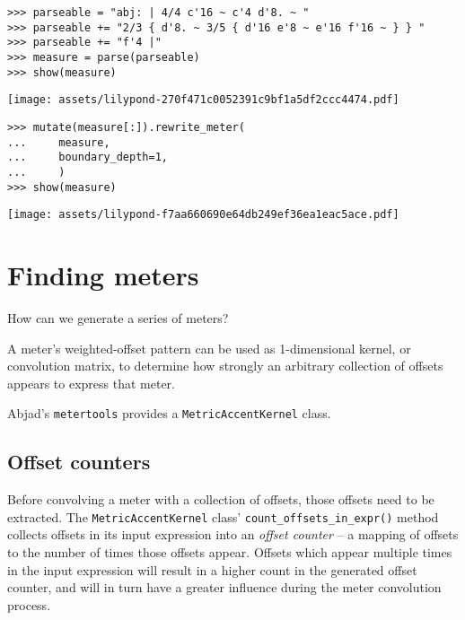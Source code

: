 \begin{singlespacing}
\vspace{-0.5\baselineskip}
\begin{lstlisting}
>>> parseable = "abj: | 4/4 c'16 ~ c'4 d'8. ~ "
>>> parseable += "2/3 { d'8. ~ 3/5 { d'16 e'8 ~ e'16 f'16 ~ } } "
>>> parseable += "f'4 |"
>>> measure = parse(parseable)
>>> show(measure)
\end{lstlisting}
\texttt{[image: assets/lilypond-270f471c0052391c9bf1a5df2ccc4474.pdf]}
\end{singlespacing}

\begin{comment}
<abjad>
mutate(measure[:]).rewrite_meter(
    measure,
    boundary_depth=1,
    )
show(measure)
</abjad>
\end{comment}

\begin{singlespacing}
\vspace{-0.5\baselineskip}
\begin{lstlisting}
>>> mutate(measure[:]).rewrite_meter(
...     measure,
...     boundary_depth=1,
...     )
>>> show(measure)
\end{lstlisting}
\texttt{[image: assets/lilypond-f7aa660690e64db249ef36ea1eac5ace.pdf]}
\end{singlespacing}

\section{Finding meters}

How can we generate a series of meters?

A meter's weighted-offset pattern can be used as 1-dimensional kernel, or
convolution matrix, to determine how strongly an arbitrary collection of
offsets appears to express that meter.

Abjad's \texttt{metertools} provides a \texttt{MetricAccentKernel} class.

\subsection{Offset counters} %

Before convolving a meter with a collection of offsets, those offsets need to
be extracted. The \texttt{MetricAccentKernel} class'
\texttt{count\_offsets\_in\_expr()} method collects offsets in its input
expression into an \emph{offset counter} -- a mapping of offsets to the number
of times those offsets appear. Offsets which appear multiple times in the input
expression will result in a higher count in the generated offset counter, and
will in turn have a greater influence during the meter convolution process.

